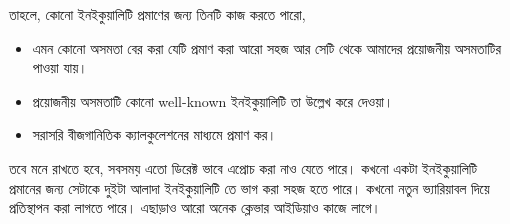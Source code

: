 \documentclass[12pt]{article}
\begin{document}
তাহলে, কোনো ইনইকুয়ালিটি প্রমাণের জন্য তিনটি কাজ করতে পারো,
\begin{itemize}
    \item এমন কোনো অসমতা বের করা যেটি প্রমাণ করা আরো সহজ আর সেটি থেকে আমাদের প্রয়োজনীয় অসমতাটির পাওয়া যায়।
    \item প্রয়োজনীয় অসমতাটি কোনো well-known ইনইকুয়ালিটি তা উল্লেখ করে দেওয়া।
    \item সরাসরি বীজগানিতিক ক্যালকুলেশনের মাধ্যমে প্রমাণ কর। 
\end{itemize} 
তবে মনে রাখতে হবে, সবসময় এতো ডিরেক্ট ভাবে এপ্রোচ করা নাও যেতে পারে। কখনো একটা ইনইকুয়ালিটি প্রমানের জন্য সেটাকে 
দুইটা আলাদা ইনইকুয়ালিটি তে ভাগ করা সহজ হতে পারে। কখনো নতুন ভ্যারিয়াবল দিয়ে প্রতিস্থাপন করা লাগতে পারে। 
এছাড়াও আরো অনেক ক্লেভার আইডিয়াও কাজে লাগে।


\end{document}
